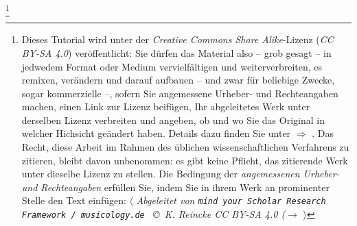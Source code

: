 %
%
%

\footnote{Dieses Tutorial wird unter der \textit{Creative Commons Share
Alike}-Lizenz (\textit{CC BY-SA 4.0}) veröffentlicht: Sie dürfen das Material
also -- grob gesagt -- in jedwedem Format oder Medium vervielfältigen und
weiterverbreiten, es remixen, verändern und darauf aufbauen -- und zwar für
beliebige Zwecke, sogar kommerzielle --, sofern Sie angemessene Urheber- und
Rechteangaben machen, einen Link zur Lizenz beifügen, Ihr abgeleitetes Werk
unter derselben Lizenz verbreiten und angeben, ob und wo Sie das Original in
welcher Hichsicht geändert haben. Details dazu finden Sie unter $\Rightarrow$
.
Das Recht, diese Arbeit im Rahmen des üblichen wissenschaftlichen Verfahrens zu
zitieren, bleibt davon unbenommen: es gibt keine Pflicht, das zitierende Werk
unter dieselbe Lizenz zu stellen. Die Bedingung der \textit{an\-ge\-mes\-se\-nen
Urheber- und Rechteangaben} erfüllen Sie, indem Sie in ihrem Werk an prominenter
Stelle den Text einfügen: $\langle$ {\itshape Abgeleitet von \texttt{mind your
Scholar Research Framework / musicology.de } \copyright\ K. Reincke CC BY-SA 4.0
($\rightarrow$
 }
$\rangle$ }


